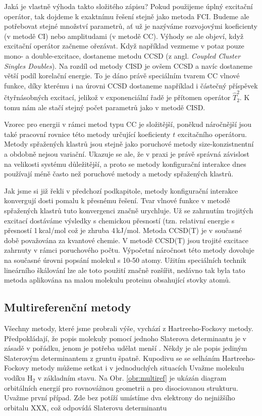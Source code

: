 Jaká je vlastně výhoda takto složitého zápisu?
Pokud použijeme úplný excitační operátor, tak dojdeme k exaktnímu řešení stejně jako metoda FCI. Budeme ale potřebovat stejné množství parametrů, ať už je nazýváme rozvojovými koeficienty (v metodě CI) nebo amplitudami (v metodě CC).
Výhody se ale objeví, když excitační operátor začneme ořezávat. Když například vezmeme v potaz pouze mono- a double-excitace, dostaneme metodu CCSD  (z angl. \textit{Coupled Cluster Singles Doubles}).
Na rozdíl od metody CISD je ovšem CCSD  a navíc dostaneme větší podíl korelační energie.
To je dáno právě speciálním tvarem CC vlnové funkce, díky kterému i na úrovni CCSD dostaneme například i částečný příspěvek čtyřnásobných excitací, jelikož v exponenciální řadě je přítomen operátor $\hat{T}_2^2$. K tomu nám ale stačí stejný počet parametrů jako v metodě CISD.

Vzorec pro energii v rámci metod typu CC je složitější, poněkud náročnější jsou také pracovní rovnice této metody určující koeficienty $t$ excitačního operátoru. Metody spřažených klastrů jsou stejně jako poruchové metody size-konzistnentní a obdobně nejsou variační. Ukazuje se ale, že v praxi je právě správná závislost na velikosti systému důležitější, a proto se metody konfigurační interakce dnes používají méně často než poruchové metody a metody spřažených klastrů.

Jak jsme si již řekli v předchozí podkapitole, metody konfigurační interakce konvergují dosti pomalu k přesnému řešení. Tvar vlnové funkce v metodě spřažených klastrů tuto konvergenci značně urychluje. Už se zahrnutím trojitých excitací dostáváme výsledky s chemickou přesností (tzn. relativní energie s přesností 1\,kcal/mol což je zhruba 4\,kJ/mol.
Metoda CCSD(T) je v současné době považována za  kvantové chemie. V metodě CCSD(T) jsou trojité excitace zahrnuty v rámci poruchového počtu. Výpočetní náročnost této metody dovoluje na současné úrovni popsání molekul s 10-50
atomy. Užitím speciálních technik lineárního škálování lze ale toto použití značně rozšířit, nedávno tak byla tato metoda aplikována na malou molekulu proteinu obsahující stovky atomů. 

\subsection{Multireferenční metody}

Všechny metody, které jsme probrali výše, vychází z Hartreeho-Fockovy metody. Předpokládají, že popis molekuly pomocí jednoho Slaterova determinantu je v zásadě v pořádku, jenom je potřeba udělat menší . Někdy je ale popis jediným Slaterovým determinantem z gruntu špatně. Kupodivu se se selháním Hartreeho-Fockovy metody můžeme setkat i v jednoduchých situacích Uvažme molekulu vodíku H$_2$ v základním stavu. Na Obr. \ref{obr:multiref} je ukázán diagram orbitálních energií pro rovnovážnou geometrii a pro disociovanou strukturu. Uvažme první případ. Zde bez potíží umístíme dva elektrony do nejnižšího orbitalu XXX, což odpovídá Slaterovu determinantu

